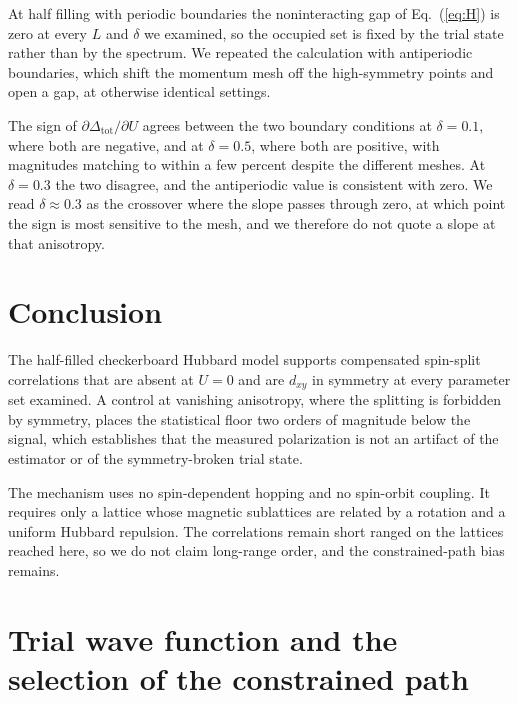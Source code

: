 \documentclass[aps,prb,reprint,superscriptaddress,amsmath,amssymb,floatfix]{revtex4-2}
\begin{document}
At half filling with periodic boundaries the noninteracting gap of
Eq.~(\ref{eq:H}) is zero at every $L$ and $\delta$ we examined, so the occupied
set is fixed by the trial state rather than by the spectrum. We repeated the
calculation with antiperiodic boundaries, which shift the momentum mesh off the
high-symmetry points and open a gap, at otherwise identical settings.

The sign of $\partial \Delta_{\mathrm{tot}} / \partial U$ agrees between the two
boundary conditions at $\delta = 0.1$, where both are negative, and at
$\delta = 0.5$, where both are positive, with magnitudes matching to within a
few percent despite the different meshes. At $\delta = 0.3$ the two disagree,
and the antiperiodic value is consistent with zero. We read $\delta \approx 0.3$
as the crossover where the slope passes through zero, at which point the sign is
most sensitive to the mesh, and we therefore do not quote a slope at that
anisotropy.



\section{Conclusion}
The half-filled checkerboard Hubbard model supports compensated spin-split
correlations that are absent at $U=0$ and are $d_{xy}$ in symmetry at every
parameter set examined. A control at vanishing anisotropy, where the splitting is
forbidden by symmetry, places the statistical floor two orders of magnitude below
the signal, which establishes that the measured polarization is not an artifact
of the estimator or of the symmetry-broken trial state.

The mechanism uses no spin-dependent hopping and no spin-orbit coupling. It
requires only a lattice whose magnetic sublattices are related by a rotation and
a uniform Hubbard repulsion. The correlations remain short ranged on the
lattices reached here, so we do not claim long-range order, and the
constrained-path bias remains.

\appendix

\section{Trial wave function and the selection of the constrained path}
\label{app:trial}
\end{document}
